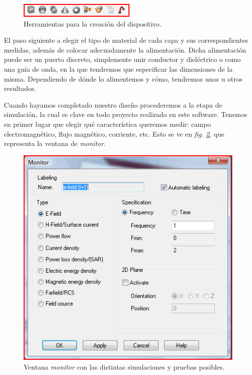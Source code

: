\begin{figure}[!htb]
    \centering
    \includegraphics[scale=0.7]{./Metodologia/CST_figures}
    \caption{Herramientas para la creación del dispositivo.}
    \label{fig:fig4.5}
\end{figure}

El paso siguiente a elegir el tipo de material de cada capa y sus correspondientes medidas, además de colocar adecuadamente la alimentación. Dicha alimentación puede ser un puerto discreto, simplemente unir conductor y dieléctrico o como una guía de onda, en la que tendremos que especificar las dimensiones de la misma. Dependiendo de dónde lo alimentemos y cómo, tendremos unos u otros resultados.

Cuando hayamos completado nuestro diseño procederemos a la etapa de simulación, la cual es clave en todo proyecto realizado en este software. Tenemos en primer lugar que elegir qué característica queremos medir: campo electromagnético, flujo magnético, corriente, etc. Esto se ve en \textit{fig. \ref{fig:fig4.6}}, que representa la ventana de \textit{monitor}.

\clearpage

\begin{figure}[!htb]
    \centering
    \includegraphics[scale=0.45]{./Metodologia/CST_monitor}
    \caption{Ventana \textit{monitor} con las distintas simulaciones y pruebas posibles.}
    \label{fig:fig4.6}
\end{figure}

